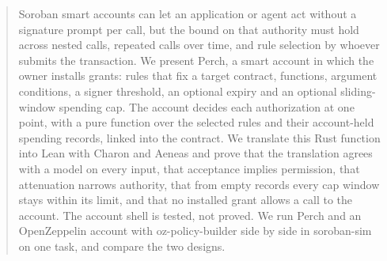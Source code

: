 \begin{abstract}
Soroban smart accounts can let an application or agent act without a signature
prompt per call, but the bound on that authority must hold across nested calls,
repeated calls over time, and rule selection by whoever submits the
transaction. We present Perch, a smart account in which the owner installs
grants: rules that fix a target contract, functions, argument conditions, a
signer threshold, an optional expiry and an optional sliding-window spending
cap. The account decides each authorization at one point, with a pure function
over the selected rules and their account-held spending records, linked into
the contract. We translate this Rust function into Lean with Charon and Aeneas
and prove that the translation agrees with a model on every input, that
acceptance implies permission, that attenuation narrows authority, that from
empty records every cap window stays within its limit, and that no installed
grant allows a call to the account. The account shell is tested, not proved. We
run Perch and an OpenZeppelin account with oz-policy-builder side by side in
soroban-sim on one task, and compare the two designs.
\end{abstract}
